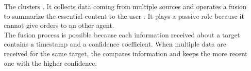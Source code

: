 The  clusters . It collects data coming from multiple sources and operates a fusion to summarize the essential content to the user . It plays a passive role because it cannot give orders to an other agent.\\

The fusion process is possible because each information received about a target contains a timestamp and a confidence coefficient. When multiple data are received for the same target, the  compares information and keeps the more recent one with the higher confidence. 
